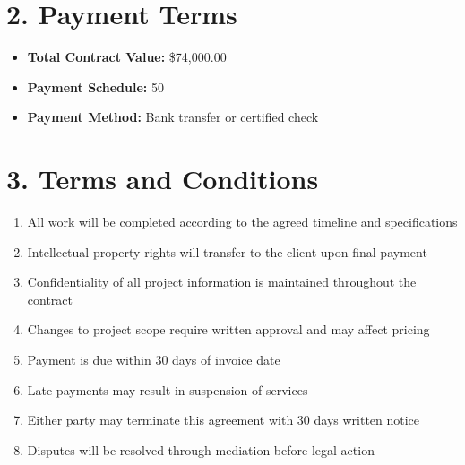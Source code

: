 \documentclass[a4paper,11pt]{article}
\begin{document}
\section{2. Payment Terms}
\begin{itemize}
    \item \textbf{Total Contract Value:} \$74,000.00
    \item \textbf{Payment Schedule:} 50%
    \item \textbf{Payment Method:} Bank transfer or certified check
\end{itemize}

\vspace{0.5cm}

\section{3. Terms and Conditions}
 
\begin{enumerate}
    
    \item All work will be completed according to the agreed timeline and specifications
    
    \item Intellectual property rights will transfer to the client upon final payment
    
    \item Confidentiality of all project information is maintained throughout the contract
    
    \item Changes to project scope require written approval and may affect pricing
    
    \item Payment is due within 30 days of invoice date
    
    \item Late payments may result in suspension of services
    
    \item Either party may terminate this agreement with 30 days written notice
    
    \item Disputes will be resolved through mediation before legal action
    
\end{enumerate} 
\end{document}
